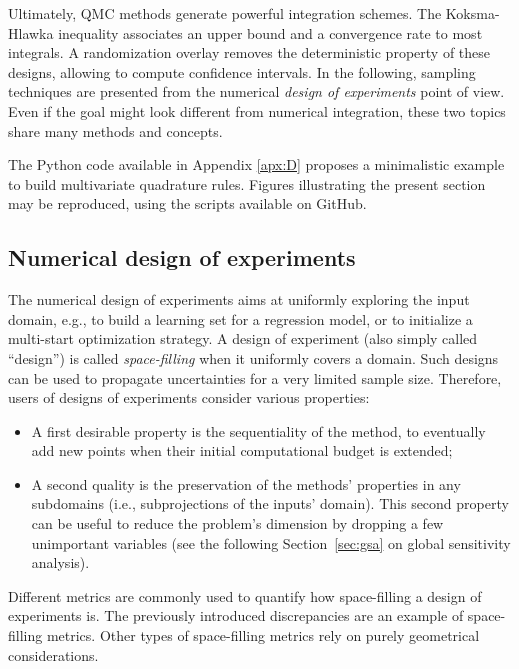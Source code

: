 Ultimately, QMC methods generate powerful integration schemes. 
The Koksma-Hlawka inequality associates an upper bound and a convergence rate to most integrals. 
A randomization overlay removes the deterministic property of these designs, allowing to compute confidence intervals. 
In the following, sampling techniques are presented from the numerical \textit{design of experiments} point of view. 
Even if the goal might look different from numerical integration, these two topics share many methods and concepts. 


\begin{otexample}
    The Python code available in Appendix \ref{apx:D} proposes a minimalistic \ots example to build multivariate quadrature rules. 
    Figures illustrating the present section may be reproduced, using the \ots scripts available on GitHub\footnotemark.  
\end{otexample}

\subsection{Numerical design of experiments} \label{sec:LHS}
The numerical design of experiments aims at uniformly exploring the input domain, e.g., to build a learning set for a regression model, or to initialize a multi-start optimization strategy. 
A design of experiment (also simply called ``design'') is called \textit{space-filling} when it uniformly covers a domain. 
Such designs can be used to propagate uncertainties for a very limited sample size. 
Therefore, users of designs of experiments consider various properties: 
\begin{itemize}
    \item A first desirable property is the sequentiality of the method, to eventually add new points when their initial computational budget is extended; 
    \item A second quality is the preservation of the methods' properties in any subdomains (i.e., subprojections of the inputs’ domain). 
    This second property can be useful to reduce the problem's dimension by dropping a few unimportant variables (see the following Section~\ref{sec:gsa} on global sensitivity analysis).
\end{itemize}
Different metrics are commonly used to quantify how space-filling a design of experiments is. 
The previously introduced discrepancies are an example of space-filling metrics. 
Other types of space-filling metrics rely on purely geometrical considerations.  

